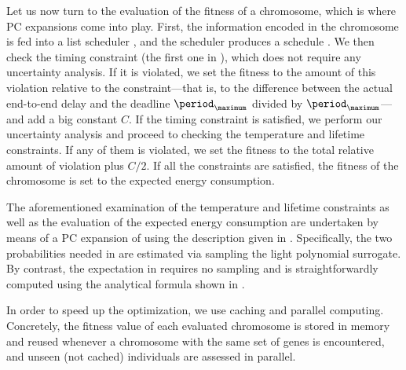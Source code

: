Let us now turn to the evaluation of the fitness of a chromosome, which is where
\ac{PC} expansions come into play. First, the information encoded in the
chromosome is fed into a list scheduler \cite{adam1974}, and the scheduler
produces a schedule \schedule. We then check the timing constraint (the first
one in ), which does not require any
uncertainty analysis. If it is violated, we set the fitness to the amount of
this violation relative to the constraint---that is, to the difference between
the actual end-to-end delay and the deadline $\period_\maximum$ divided by
$\period_\maximum$---and add a big constant $C$. If the timing constraint is
satisfied, we perform our uncertainty analysis and proceed to checking the
temperature and lifetime constraints. If any of them is violated, we set the
fitness to the total relative amount of violation plus $C / 2$. If all the
constraints are satisfied, the fitness of the chromosome is set to the expected
energy consumption.

The aforementioned examination of the temperature and lifetime constraints as
well as the evaluation of the expected energy consumption are undertaken by
means of a \ac{PC} expansion of  using the
description given in . Specifically, the two
probabilities needed in  are estimated via
sampling the light polynomial surrogate. By contrast, the expectation in
 requires no sampling and is
straightforwardly computed using the analytical formula shown in
.

\begin{remark}
In order to speed up the optimization, we use caching and parallel computing.
Concretely, the fitness value of each evaluated chromosome is stored in memory
and reused whenever a chromosome with the same set of genes is encountered, and
unseen (not cached) individuals are assessed in parallel.
\end{remark}
